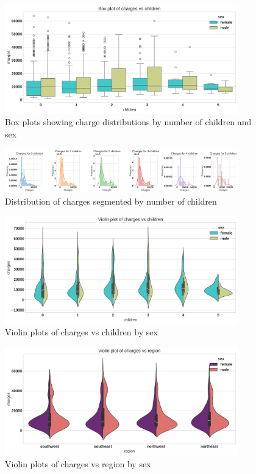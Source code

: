 \documentclass[12pt,a4paper]{article}
\begin{document}
\begin{figure}[H]
\centering
\includegraphics[width=0.9\textwidth]{boxplot_charges_vs_children.png}
\caption{Box plots showing charge distributions by number of children and sex}
\label{fig:boxplot_charges_vs_children}
\end{figure}

\begin{figure}[H]
\centering
\includegraphics[width=0.9\textwidth]{charges_distribution_by_children.png}
\caption{Distribution of charges segmented by number of children}
\label{fig:charges_distribution_by_children}
\end{figure}

\begin{figure}[H]
\centering
\includegraphics[width=0.9\textwidth]{violin_plot_charges_vs_children_by_sex.png}
\caption{Violin plots of charges vs children by sex}
\label{fig:violin_plot_charges_vs_children_by_sex}
\end{figure}

\begin{figure}[H]
\centering
\includegraphics[width=0.9\textwidth]{violin_plot_charges_vs_region_by_sex.png}
\caption{Violin plots of charges vs region by sex}
\label{fig:violin_plot_charges_vs_region_by_sex}
\end{figure}
\end{document}

